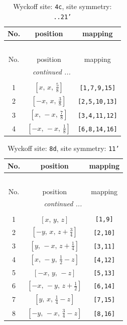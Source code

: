 \documentclass[fleqn,8pt]{jsarticle}
\begin{document}
\renewcommand{\arraystretch}{1.2}
\begin{longtable}{ccc}
\caption{Wyckoff site: {\tt 4c}, site symmetry: {\tt ..21'}}
 \\
 \hline \hline
No. & position & mapping \\ \hline \endfirsthead

\multicolumn{2}{l}{\tablename\ \thetable{}} \\
 \hline \hline
No. & position & mapping \\ \hline \endhead

 \hline \hline
\multicolumn{2}{r}{\footnotesize\it continued ...} \\ \endfoot

 \hline \hline
\multicolumn{2}{r}{} \\ \endlastfoot

1 & $\left[ x,\, x,\, \frac{5}{8} \right]$ & {\tt [1,7,9,15]} \\ \hline
2 & $\left[ - x,\, x,\, \frac{3}{8} \right]$ & {\tt [2,5,10,13]} \\ \hline
3 & $\left[ x,\, - x,\, \frac{7}{8} \right]$ & {\tt [3,4,11,12]} \\ \hline
4 & $\left[ - x,\, - x,\, \frac{1}{8} \right]$ & {\tt [6,8,14,16]} \\
\end{longtable}
\renewcommand{\arraystretch}{1.2}
\begin{longtable}{ccc}
\caption{Wyckoff site: {\tt 8d}, site symmetry: {\tt 11'}}
 \\
 \hline \hline
No. & position & mapping \\ \hline \endfirsthead

\multicolumn{2}{l}{\tablename\ \thetable{}} \\
 \hline \hline
No. & position & mapping \\ \hline \endhead

 \hline \hline
\multicolumn{2}{r}{\footnotesize\it continued ...} \\ \endfoot

 \hline \hline
\multicolumn{2}{r}{} \\ \endlastfoot

1 & $\left[ x,\, y,\, z \right]$ & {\tt [1,9]} \\ \hline
2 & $\left[ - y,\, x,\, z + \frac{3}{4} \right]$ & {\tt [2,10]} \\ \hline
3 & $\left[ y,\, - x,\, z + \frac{1}{4} \right]$ & {\tt [3,11]} \\ \hline
4 & $\left[ x,\, - y,\, \frac{1}{2} - z \right]$ & {\tt [4,12]} \\ \hline
5 & $\left[ - x,\, y,\, - z \right]$ & {\tt [5,13]} \\ \hline
6 & $\left[ - x,\, - y,\, z + \frac{1}{2} \right]$ & {\tt [6,14]} \\ \hline
7 & $\left[ y,\, x,\, \frac{1}{4} - z \right]$ & {\tt [7,15]} \\ \hline
8 & $\left[ - y,\, - x,\, \frac{3}{4} - z \right]$ & {\tt [8,16]} \\
\end{longtable}
\end{document}
